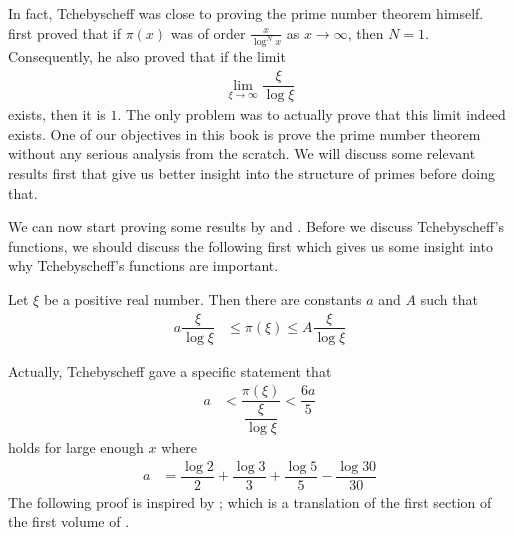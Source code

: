 \documentclass[elemannt.tex]{subfile}
\begin{document}
	In fact, Tchebyscheff was close to proving the prime number theorem himself. \textcite{tschebischeff_1852} first proved that if $\pi(x)$ was of order $\frac{x}{\log^{N}{x}}$ as $x\to\infty$, then $N=1$. Consequently, he also proved that if the limit
		\begin{align*}
			\lim_{\xi\to\infty}\dfrac{\xi}{\log{\xi}}
		\end{align*}
	exists, then it is $1$. The only problem was to actually prove that this limit indeed exists. One of our objectives in this book is prove the prime number theorem without any serious analysis from the scratch. We will discuss some relevant results first that give us better insight into the structure of primes before doing that.
		
	We can now start proving some results by \textcite{tchebycheff_1852} and \textcite{tschebischeff_1852}. Before we discuss Tchebyscheff's functions, we should discuss the following first which gives us some insight into why Tchebyscheff's functions are important.
		\begin{theorem}
			Let $\xi$ be a positive real number. Then there are constants $a$ and $A$ such that
				\begin{align*}
					a\dfrac{\xi}{\log{\xi}}
						& \leq \pi(\xi) \leq A\dfrac{\xi}{\log{\xi}}
				\end{align*}
		\end{theorem}
	Actually, Tchebyscheff gave a specific statement that
		\begin{align*}
			a
				& < \dfrac{\pi(\xi)}{\dfrac{\xi}{\log{\xi}}} < \dfrac{6a}{5}
		\end{align*}
	holds for large enough $x$ where
		\begin{align*}
			a
				& = \dfrac{\log{2}}{2}+\dfrac{\log{3}}{3}+\dfrac{\log{5}}{5}-\dfrac{\log{30}}{30}
		\end{align*}
	The following proof is inspired by \textcite[Theorem 112]{landau_1969}; which is a translation of the first section of the first volume of \textcite{landau_1927}.
\end{document}
